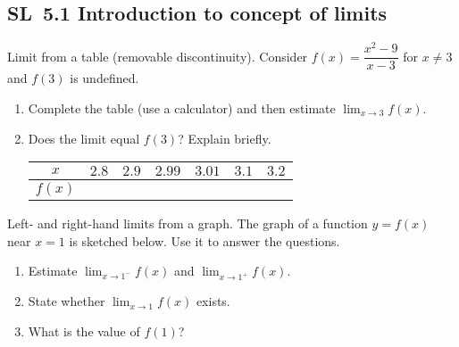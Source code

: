 \documentclass[11pt]{article}
\def\textbf#1{#1}%
\newcommand{\tocsubsection}[1]{\subsection{#1}}
\newcounter{question}
\begin{document}
\tocsubsection{SL 5.1 \; Introduction to concept of limits}


\begin{question}
\textbf{Limit from a table (removable discontinuity).}
Consider $f(x)=\dfrac{x^{2}-9}{x-3}$ for $x\ne 3$ and $f(3)$ is undefined.
\begin{enumerate}
  \item Complete the table (use a calculator) and then estimate $\displaystyle\lim_{x\to 3} f(x)$.
  \item Does the limit equal $f(3)$? Explain briefly.

\begin{center}
\begin{tabular}{c|cccccc}
$x$ & $2.8$ & $2.9$ & $2.99$ & $3.01$ & $3.1$ & $3.2$\\\hline
$f(x)$ & & & & & &
\end{tabular}
\end{center}
\end{enumerate}
\end{question}

\begin{question}
\textbf{Left- and right-hand limits from a graph.}
The graph of a function $y=f(x)$ near $x=1$ is sketched below. Use it to answer the questions.
\begin{enumerate}
  \item Estimate $\displaystyle\lim_{x\to 1^-} f(x)$ and $\displaystyle\lim_{x\to 1^+} f(x)$.
  \item State whether $\displaystyle\lim_{x\to 1} f(x)$ exists.
  \item What is the value of $f(1)$?
\end{enumerate}

\begin{center}
\end{center}
\end{question}
\end{document}
